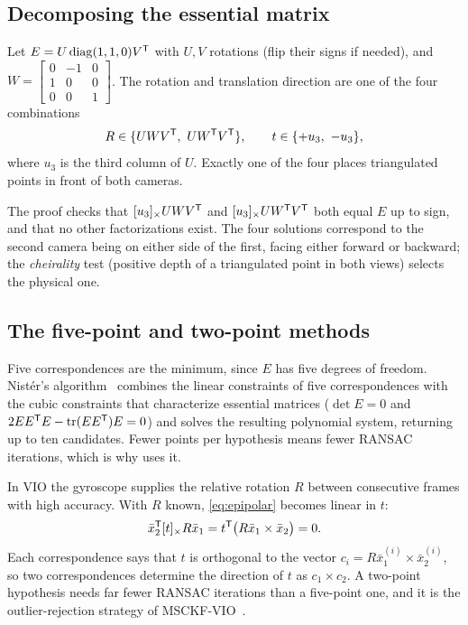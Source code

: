 \subsection{Decomposing the essential matrix}

\begin{proposition}
\label{prop:e-decomposition}
Let $E = U\operatorname{diag}(1, 1, 0)V^{\mathsf{T}}$ with $U, V$ rotations (flip their signs if needed), and $W = \begin{bmatrix}0 & -1 & 0\\ 1 & 0 & 0\\ 0 & 0 & 1\end{bmatrix}$. The rotation and translation
direction are one of the four combinations
\begin{equation}
  R \in \{UWV^{\mathsf{T}},\ UW^{\mathsf{T}} V^{\mathsf{T}}\}, \qquad t \in \{+u_3,\ -u_3\},
\end{equation}
where $u_3$ is the third column of $U$. Exactly one of the four places triangulated points in front of both cameras.
\end{proposition}

The proof checks that $[u_3]_{\times}UWV^{\mathsf{T}}$ and $[u_3]_{\times}UW^{\mathsf{T}} V^{\mathsf{T}}$ both equal $E$ up to sign, and that no other factorizations exist. The four solutions correspond to the second
camera being on either side of the first, facing either forward or backward; the \emph{cheirality} test (positive depth of a triangulated point in both views)
selects the physical one.

\subsection{The five-point and two-point methods}

Five correspondences are the minimum, since $E$ has five degrees of freedom. Nistér's algorithm~\cite{nister2004five} combines the linear constraints of five
correspondences with the cubic constraints that characterize essential matrices ($\det E = 0$ and $2EE^{\mathsf{T}} E - \operatorname{tr}(EE^{\mathsf{T}})E = 0$) and solves the resulting polynomial system,
returning up to ten candidates. Fewer points per hypothesis means fewer RANSAC iterations, which is why  uses it.

In VIO the gyroscope supplies the relative rotation $R$ between consecutive frames with high accuracy. With $R$ known, \eqref{eq:epipolar} becomes linear in $t$:
\begin{equation}
  \bar x_2^{\mathsf{T}}[t]_{\times}R\bar x_1 = t^{\mathsf{T}}\big(R\bar x_1\times\bar x_2\big) = 0 .
\end{equation}
Each correspondence says that $t$ is orthogonal to the vector $c_i = R\bar x_1^{(i)}\times\bar x_2^{(i)}$, so two correspondences determine the direction of $t$ as $c_1\times c_2$. A two-point
hypothesis needs far fewer RANSAC iterations than a five-point one, and it is the outlier-rejection strategy of MSCKF-VIO~\cite{sun2018msckfvio}.

